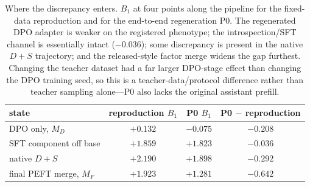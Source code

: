 \begin{table}[t]
\centering
\small
\begin{tabular}{lccc}
\toprule
state & reproduction $B_1$ & P0 $B_1$ & P0 $-$ reproduction \\
\midrule
DPO only, $M_D$ & $+0.132$ & $-0.075$ & $-0.208$ \\
SFT component off base & $+1.859$ & $+1.823$ & $-0.036$ \\
native $D+S$ & $+2.190$ & $+1.898$ & $-0.292$ \\
final PEFT merge, $M_F$ & $+1.923$ & $+1.281$ & $-0.642$ \\
\bottomrule
\end{tabular}
\caption{Where the discrepancy enters. $B_1$ at four points along the pipeline for the fixed-data reproduction and for the end-to-end regeneration P0. The regenerated DPO adapter is weaker on the registered phenotype; the introspection/SFT channel is essentially intact ($-0.036$); some discrepancy is present in the native $D+S$ trajectory; and the released-style factor merge widens the gap furthest. Changing the teacher dataset had a far larger DPO-stage effect than changing the DPO training seed, so this is a teacher-data/protocol difference rather than teacher sampling alone---P0 also lacks the original assistant prefill.}
\label{tab:paraphrase-stage}
\end{table}
